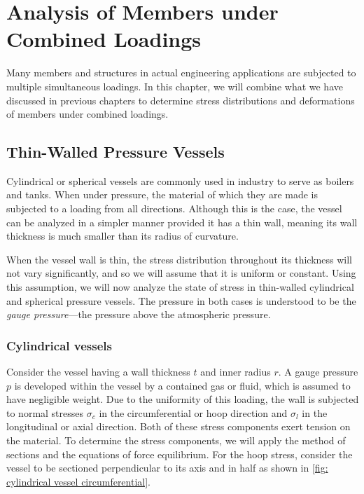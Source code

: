 \documentclass[
10pt,
a4paper,
openany,
svgnames,
]{book} %
\begin{document}

\chapter{Analysis of Members under Combined Loadings}

Many members and structures in actual engineering applications are subjected to multiple simultaneous loadings. In this chapter, we will combine what we have discussed in previous chapters to determine stress distributions and deformations of members under combined loadings.

\section{Thin-Walled Pressure Vessels}

Cylindrical or spherical vessels are commonly used in industry to serve as boilers and tanks. When under pressure, the material of which they are made is subjected to a loading from all directions. Although this is the case, the vessel can be analyzed in a simpler manner provided it has a thin wall, meaning its wall thickness is much smaller than its radius of curvature.

When the vessel wall is thin, the stress distribution throughout its thickness will not vary significantly, and so we will assume that it is uniform or constant. Using this assumption, we will now analyze the state of stress in thin-walled cylindrical and spherical pressure vessels. The pressure in both cases is understood to be the \emph{gauge pressure}—the pressure above the atmospheric pressure.

\subsection{Cylindrical vessels}

Consider the vessel having a wall thickness $t$ and inner radius $r$. A gauge pressure $p$ is developed within the vessel by a contained gas or fluid, which is assumed to have negligible weight. Due to the uniformity of this loading, the wall is subjected to normal stresses $\sigma_c$ in the circumferential or hoop direction and $\sigma_l$ in the longitudinal or axial direction. Both of these stress components exert tension on the material. To determine the stress components, we will apply the method of sections and the equations of force equilibrium. For the hoop stress, consider the vessel to be sectioned perpendicular to its axis and in half as shown in \cref{fig: cylindrical vessel circumferential}.
\end{document}
